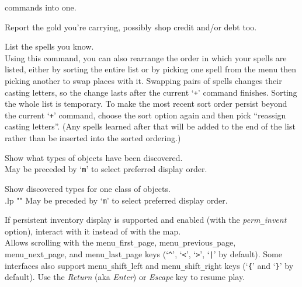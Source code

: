commands into one.
\item[\tb{\$}]
Report the gold you're carrying, possibly shop credit and/or debt too.
\item[\tb{+}]
List the spells you know.\\
Using this command, you can also rearrange
the order in which your spells are listed, either by sorting the entire
list or by picking one spell from the menu then picking another to swap
places with it.  Swapping pairs of spells changes their casting letters,
so the change lasts after the current `{\tt +}' command finishes.  Sorting
the whole list is temporary.  To make the most recent sort order persist
beyond the current `{\tt +}' command, choose the sort option again and then
pick ``reassign casting letters''.  (Any spells learned after that will
be added to the end of the list rather than be inserted into the sorted
ordering.)
\item[\tb{$\backslash$}]
Show what types of objects have been discovered.
\\
May be preceded by `{\tt m}' to select preferred display order.
\item[\tb{\`}]
Show discovered types for one class of objects.
\\
.lp ""
May be preceded by `{\tt m}' to select preferred display order.

\item[\tb{|}]
If persistent inventory display is supported and enabled (with the
{\it perm\verb+_+invent\/}
option), interact with it instead of with the map.
\\
Allows scrolling with the
menu\verb+_+first\verb+_+page, menu\verb+_+previous\verb+_+page,
menu\verb+_+next\verb+_+page, and menu\verb+_+last\verb+_+page
keys (`{\tt \^{}}', `{\tt <}', `{\tt >}', `{\tt \verb+|+}' by default).
Some interfaces also support menu\verb+_+shift\verb+_+left and menu\verb+_+shift\verb+_+right
keys (`{\tt \verb+{+}' and `{\tt \verb+}+}' by default).
Use the {\it Return\/} (aka {\it Enter\/}) or {\it Escape\/} key to
resume play.

